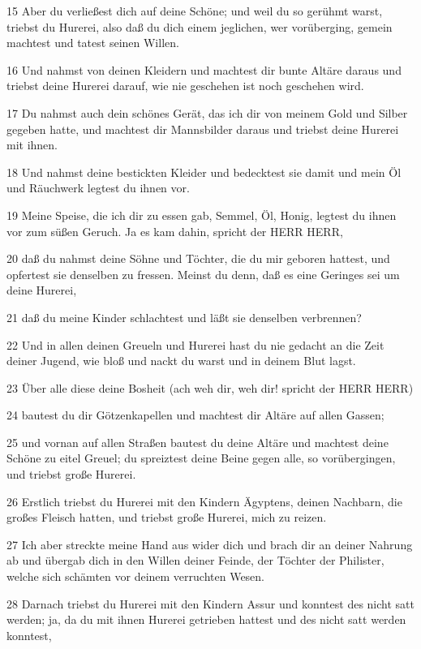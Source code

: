 \par 15 Aber du verließest dich auf deine Schöne; und weil du so gerühmt warst, triebst du Hurerei, also daß du dich einem jeglichen, wer vorüberging, gemein machtest und tatest seinen Willen.
\par 16 Und nahmst von deinen Kleidern und machtest dir bunte Altäre daraus und triebst deine Hurerei darauf, wie nie geschehen ist noch geschehen wird.
\par 17 Du nahmst auch dein schönes Gerät, das ich dir von meinem Gold und Silber gegeben hatte, und machtest dir Mannsbilder daraus und triebst deine Hurerei mit ihnen.
\par 18 Und nahmst deine bestickten Kleider und bedecktest sie damit und mein Öl und Räuchwerk legtest du ihnen vor.
\par 19 Meine Speise, die ich dir zu essen gab, Semmel, Öl, Honig, legtest du ihnen vor zum süßen Geruch. Ja es kam dahin, spricht der HERR HERR,
\par 20 daß du nahmst deine Söhne und Töchter, die du mir geboren hattest, und opfertest sie denselben zu fressen. Meinst du denn, daß es eine Geringes sei um deine Hurerei,
\par 21 daß du meine Kinder schlachtest und läßt sie denselben verbrennen?
\par 22 Und in allen deinen Greueln und Hurerei hast du nie gedacht an die Zeit deiner Jugend, wie bloß und nackt du warst und in deinem Blut lagst.
\par 23 Über alle diese deine Bosheit (ach weh dir, weh dir! spricht der HERR HERR)
\par 24 bautest du dir Götzenkapellen und machtest dir Altäre auf allen Gassen;
\par 25 und vornan auf allen Straßen bautest du deine Altäre und machtest deine Schöne zu eitel Greuel; du spreiztest deine Beine gegen alle, so vorübergingen, und triebst große Hurerei.
\par 26 Erstlich triebst du Hurerei mit den Kindern Ägyptens, deinen Nachbarn, die großes Fleisch hatten, und triebst große Hurerei, mich zu reizen.
\par 27 Ich aber streckte meine Hand aus wider dich und brach dir an deiner Nahrung ab und übergab dich in den Willen deiner Feinde, der Töchter der Philister, welche sich schämten vor deinem verruchten Wesen.
\par 28 Darnach triebst du Hurerei mit den Kindern Assur und konntest des nicht satt werden; ja, da du mit ihnen Hurerei getrieben hattest und des nicht satt werden konntest,

